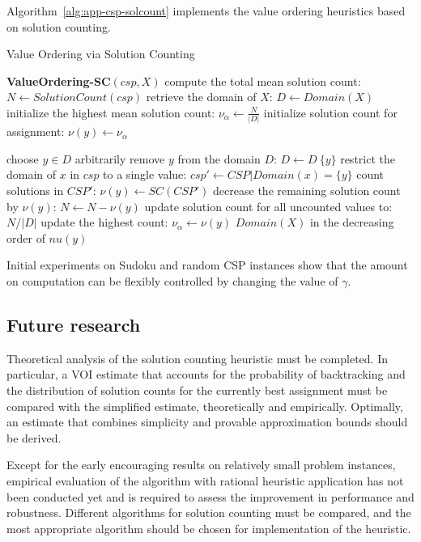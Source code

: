 Algorithm~\ref{alg:app-csp-solcount} implements the value ordering heuristics based on solution counting.
\begin{algorithm}
\caption{Value Ordering via Solution Counting}
\label{alg:app-csp-solcount}
\begin{algorithmic}[1]
\item[{\bf ValueOrdering-SC}$(csp, X)$]
\STATE compute the total mean solution count: $N \leftarrow SolutionCount(csp)$
\STATE retrieve the domain of $X$: $D \leftarrow Domain(X)$
\STATE initialize the highest mean solution count: $\nu_\alpha \leftarrow \frac N {|D|}$
  \STATE initialize solution count for assignment: $\nu(y) \leftarrow \nu_\alpha$
\ENDFOR

  \STATE choose $y \in D$ arbitrarily
  \STATE remove $y$ from the domain $D$: $D \leftarrow D \ \{y\}$
  \STATE restrict the domain of $x$ in $csp$ to a single value: $csp' \leftarrow CSP|Domain(x)=\{y\}$
  \STATE count solutions in $CSP'$: $\nu(y) \leftarrow SC(CSP')$
  \STATE decrease the remaining solution count by $\nu(y)$: $N \leftarrow N - \nu(y)$
  \STATE update solution count for all uncounted values to: $N/|D|$
    \STATE update the highest count: $\nu_\alpha \leftarrow \nu(y)$
  \ENDIF
  \ENDWHILE
\RETURN $Domain(X)$ in the decreasing order of $nu(y)$
\end{algorithmic}
\end{algorithm}

Initial experiments on Sudoku and random CSP instances show that the
amount on computation can be flexibly controlled by changing the value
of $\gamma$.

\subsection{Future research}

Theoretical analysis of the solution counting heuristic must be
completed. In particular, a VOI estimate that accounts for the
probability of backtracking and the distribution of solution counts
for the currently best assignment must be compared with the simplified
estimate, theoretically and empirically. Optimally, an estimate that
combines simplicity and provable approximation bounds should be
derived.
 
Except for the early encouraging results on relatively small problem
instances, empirical evaluation of the algorithm with rational
heuristic application has not been conducted yet and is required to
assess the improvement in performance and robustness. Different
algorithms for solution counting must be compared, and the most
appropriate algorithm should be chosen for implementation of the
heuristic. 

